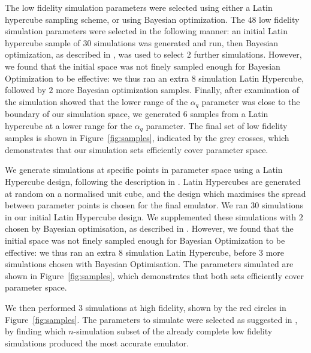 \documentclass[a4paper,11pt]{article}
\begin{document}
The low fidelity simulation parameters were selected using either a Latin hypercube sampling scheme, or using Bayesian optimization.
The $48$ low fidelity simulation parameters were selected in the following manner: an initial Latin hypercube sample of $30$ simulations was generated and run, then Bayesian optimization, as described in \cite{Rogers:2019}, was used to select $2$ further simulations.
However, we found that the initial space was not finely sampled enough for Bayesian Optimization to be effective: we thus ran an extra $8$ simulation Latin Hypercube, followed by $2$ more Bayesian optimization samples. Finally, after examination of the simulation showed that the lower range of the $\alpha_q$ parameter was close to the boundary of our simulation space, we generated $6$ samples from a Latin hypercube at a lower range for the $\alpha_q$ parameter.
The final set of low fidelity samples is shown in Figure~\ref{fig:samples}, indicated by the grey crosses, which demonstrates that our simulation sets efficiently cover parameter space.

We generate simulations at specific points in parameter space using a Latin Hypercube design, following the description in \cite{Bird:2019}. Latin Hypercubes are generated at random on a normalised unit cube, and the design which maximises the spread between parameter points is chosen for the final emulator. We ran $30$ simulations in our initial Latin Hypercube design. We supplemented these simulations with $2$ chosen by Bayesian optimisation, as described in \cite{Rogers:2019}. However, we found that the initial space was not finely sampled enough for Bayesian Optimization to be effective: we thus ran an extra $8$ simulation Latin Hypercube, before $3$ more simulations chosen with Bayesian Optimisation. The parameters simulated are shown in Figure~\ref{fig:samples}, which demonstrates that both sets efficiently cover parameter space.

We then performed $3$ simulations at high fidelity, shown by the red circles in Figure~\ref{fig:samples}. The parameters to simulate were selected as suggested in \cite{Ho:2022,Fernandez:2022}, by finding which $n$-simulation subset of the already complete low fidelity simulations produced the most accurate emulator.
\end{document}
